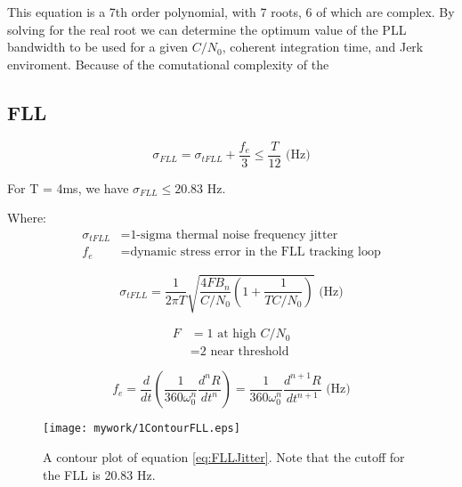 This equation is a 7th order polynomial, with 7 roots, 6 of which are complex. By solving for the real root we can determine the optimum value of the PLL bandwidth to be used for a given $C/N_0$, coherent integration time, and Jerk enviroment. Because of the comutational complexity of the  

\subsection{FLL}


\begin{comment}
Talk about this
5.6.2 FLL Tracking Loop Measurement Errors

Generate figure 5.24
Generate figure 5.25

Also talk about section 5.6.2
\end{comment}

\begin{equation}\label{eq:FLLJitter}
\sigma_{FLL} =  \sigma_{tFLL} + \frac{f_e}{3} \leq \frac{T}{12} \text{ (Hz)}
\end{equation}

For T = 4ms, we have $\sigma_{FLL} \leq 20.83$ Hz.

Where:
\begin{align*}
\sigma_{tFLL} &= \text{1-sigma thermal noise frequency jitter}\\
f_e &= \text{dynamic stress error in the FLL tracking loop}
\end{align*}


\begin{equation}
\sigma_{tFLL} = \frac{1}{2 \pi T} \sqrt{ \frac{4FB_n}{C/N_0}(1 + \frac{1}{TC/N_0})} \text{ (Hz)}
\end{equation}

\begin{align*}
F &= \text{1 at high } C/N_0\\
  &= \text{2 near threshold}
\end{align*}


\begin{equation}
f_e = \frac{d}{dt}(\frac{1}{360 \omega^n_0}\frac{d^nR}{dt^n}) = \frac{1}{360\omega^n_0} \frac{d^{n+1}R}{dt^{n+1}} \text{ (Hz)}
\end{equation}


\begin{figure}[!htb] 
    \centering
    \texttt{[image: mywork/1ContourFLL.eps]} 
    \caption{A contour plot of equation \ref{eq:FLLJitter}. Note that the cutoff for the FLL is 20.83 Hz. }
\label{fig:FLLContour1}
\end{figure}

